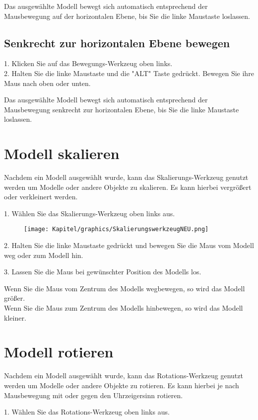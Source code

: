 Das ausgewählte Modell bewegt sich automatisch entsprechend der Mausbewegung auf der horizontalen Ebene, bis Sie die linke Maustaste loslassen.

\subsection{Senkrecht zur horizontalen Ebene bewegen}
1. Klicken Sie auf das Bewegungs-Werkzeug oben links.\\
2. Halten Sie die linke Maustaste und die "ALT" Taste gedrückt. Bewegen Sie ihre Maus nach oben oder unten.

Das ausgewählte Modell bewegt sich automatisch entsprechend der Mausbewegung senkrecht zur horizontalen Ebene, bis Sie die linke Maustaste loslassen.


\section{Modell skalieren}
Nachdem ein Modell ausgewählt wurde, kann das Skalierungs-Werkzeug genutzt werden um Modelle oder andere Objekte zu skalieren. Es kann hierbei vergrößert oder verkleinert werden.

1. Wählen Sie das Skalierungs-Werkzeug oben links aus.

\begin{figure}[th]
    \centering
    \texttt{[image: Kapitel/graphics/SkalierungswerkzeugNEU.png]}
    \label{fig:enter-label}
\end{figure}

2. Halten Sie die linke Maustaste gedrückt und bewegen Sie die Maus vom Modell weg oder zum Modell hin.

3. Lassen Sie die Maus bei gewünschter Position des Modells los.

Wenn Sie die Maus vom Zentrum des Modells wegbewegen, so wird das Modell größer.\\
Wenn Sie die Maus zum Zentrum des Modells hinbewegen, so wird das Modell kleiner.


\section{Modell rotieren}
Nachdem ein Modell ausgewählt wurde, kann das Rotations-Werkzeug genutzt werden um Modelle oder andere Objekte zu rotieren. Es kann hierbei je nach Mausbewegung mit oder gegen den Uhrzeigersinn rotieren.

1. Wählen Sie das Rotations-Werkzeug oben links aus.

